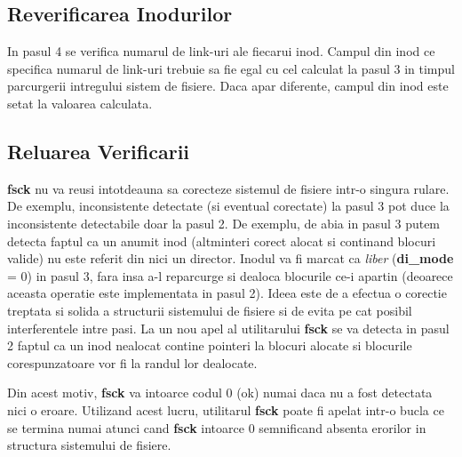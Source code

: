 \subsection{Reverificarea Inodurilor}

In pasul 4 se verifica numarul de link-uri ale fiecarui inod.  Campul
din inod ce specifica numarul de link-uri trebuie sa fie egal cu cel
calculat la pasul 3 in timpul parcurgerii intregului sistem de
fisiere.  Daca apar diferente, campul din inod este setat la valoarea
calculata.


\subsection{Reluarea Verificarii}


{\bf fsck} nu va reusi intotdeauna sa corecteze sistemul de fisiere
intr-o singura rulare.  De exemplu, inconsistente detectate (si
eventual corectate) la pasul 3 pot duce la inconsistente detectabile
doar la pasul 2.  De exemplu, de abia in pasul 3 putem detecta faptul
ca un anumit inod (altminteri corect alocat si continand blocuri
valide) nu este referit din nici un director.  Inodul va fi marcat ca
{\em liber} ({\bf di\_mode} = 0) in pasul 3, fara insa a-l reparcurge
si dealoca blocurile ce-i apartin (deoarece aceasta operatie este
implementata in pasul 2).  Ideea este de a efectua o corectie treptata
si solida a structurii sistemului de fisiere si de evita pe cat
posibil interferentele intre pasi.  La un nou apel al utilitarului
{\bf fsck} se va detecta in pasul 2 faptul ca un inod nealocat contine
pointeri la blocuri alocate si blocurile corespunzatoare vor fi la
randul lor dealocate.

Din acest motiv, {\bf fsck} va intoarce codul 0 (ok) numai daca nu a
fost detectata nici o eroare.  Utilizand acest lucru, utilitarul {\bf
fsck} poate fi apelat intr-o bucla ce se termina numai atunci cand
{\bf fsck} intoarce 0 semnificand absenta erorilor in structura
sistemului de fisiere.


